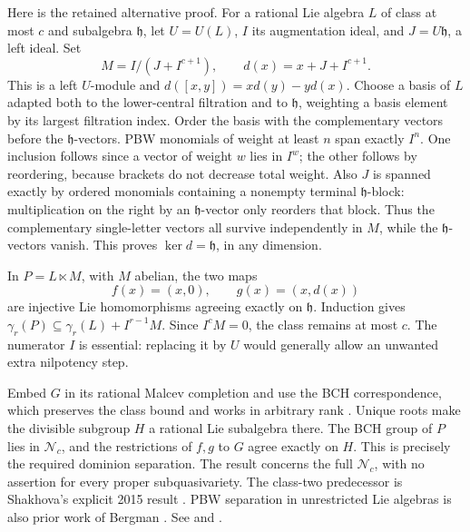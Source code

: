 Here is the retained alternative proof.
For a rational Lie algebra \(L\) of class at most \(c\) and
subalgebra \(\mathfrak h\), let \(U=U(L)\), \(I\) its
augmentation ideal, and \(J=U\mathfrak h\), a left ideal.
Set
\[
 M=I/(J+I^{c+1}),\qquad d(x)=x+J+I^{c+1}.
\]
This is a left \(U\)-module and
\(d([x,y])=xd(y)-yd(x)\).
Choose a basis of \(L\) adapted both to the lower-central
filtration and to \(\mathfrak h\), weighting a basis element
by its largest filtration index. Order the basis with
the complementary vectors before the \(\mathfrak h\)-vectors.
PBW monomials of weight at least \(n\) span exactly \(I^n\).
One inclusion follows since a vector of weight \(w\) lies
in \(I^w\); the other follows by reordering, because brackets
do not decrease total weight.
Also \(J\) is spanned exactly by ordered monomials containing
a nonempty terminal \(\mathfrak h\)-block: multiplication on
the right by an \(\mathfrak h\)-vector only reorders that block.
Thus the complementary single-letter vectors all survive
independently in \(M\), while the \(\mathfrak h\)-vectors vanish.
This proves \(\ker d=\mathfrak h\), in any dimension.

In \(P=L\ltimes M\), with \(M\) abelian, the two maps
\[
 f(x)=(x,0),\qquad g(x)=(x,d(x))
\]
are injective Lie homomorphisms agreeing exactly on
\(\mathfrak h\). Induction gives
\(\gamma_r(P)\subseteq\gamma_r(L)+I^{r-1}M\).
Since \(I^cM=0\), the class remains at most \(c\).
The numerator \(I\) is essential: replacing it by \(U\)
would generally allow an unwanted extra nilpotency step.

Embed \(G\) in its rational Malcev completion and use the
BCH correspondence, which preserves the class bound and
works in arbitrary rank \cite{bahturin-olshanskii}.
Unique roots make the divisible subgroup \(H\) a rational
Lie subalgebra there. The BCH group of \(P\) lies in
\(\mathcal N_c\), and the restrictions of \(f,g\) to \(G\)
agree exactly on \(H\). This is precisely the required
dominion separation. The result concerns the full
\(\mathcal N_c\), with no assertion for every proper
subquasivariety. The class-two predecessor is Shakhova's
explicit 2015 result \cite{shakhova-2015}.
PBW separation in unrestricted Lie algebras is also prior
work of Bergman \cite{bergman-lie}.
See  and
.
